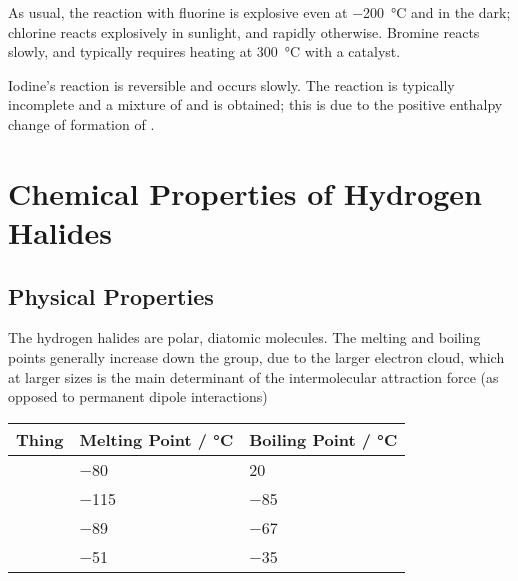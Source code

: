 			As usual, the reaction with fluorine is explosive even at \SI{-200}{\celsius} and in the dark; chlorine reacts explosively
			in sunlight, and rapidly otherwise. Bromine reacts slowly, and typically requires heating at \SI{300}{\celsius} with a 
			catalyst.

			Iodine's reaction is reversible and occurs slowly. The reaction is typically incomplete and a mixture of  and 
			is obtained; this is due to the positive enthalpy change of formation of .





	\pagebreak
	\section{Chemical Properties of Hydrogen Halides}

		\subsection{Physical Properties}

			The hydrogen halides are polar, diatomic molecules. The melting and boiling points generally increase down the group, due to
			the larger electron cloud, which at larger sizes is the main determinant of the intermolecular attraction force (as opposed to
			permanent dipole interactions)

			\begin{table}[htb]\renewcommand{\arraystretch}{1.5}\begin{center}
			\begin{tabu} to 0.7\textwidth {X[c,m] | X[c,m] | X[c,m]}

				Thing       &   Melting Point / \si{\celsius}   &   Boiling Point / \si{\celsius}   \\  \hline
				     &   \num{-80}                       &   \num{20}                        \\
				   &   \num{-115}                      &   \num{-85}                       \\
				    &   \num{-89}                       &   \num{-67}                       \\
				     &   \num{-51}                       &   \num{-35}                       \\

			\end{tabu}\end{center}
			\end{table}\vspace{-1em}

